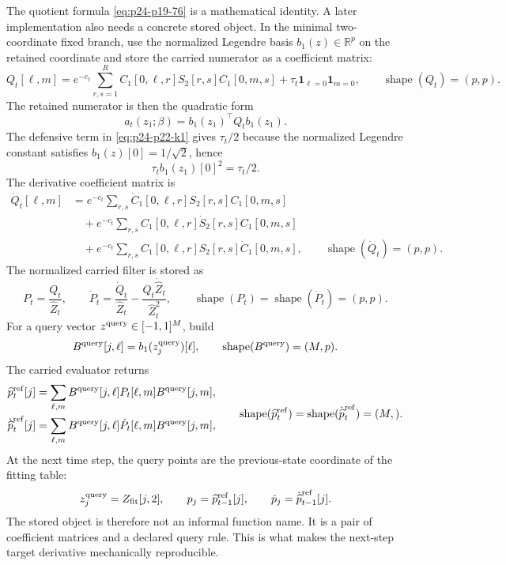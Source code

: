 \documentclass[11pt]{article}
\newcommand{\R}{\mathbb R}
\newcommand{\ind}{\mathbf 1}
\newcommand{\shape}{\operatorname{shape}}
\begin{document}
The quotient formula \eqref{eq:p24-p19-76} is a mathematical identity.  A later implementation
also needs a concrete stored object.  In the minimal two-coordinate fixed
branch, use the normalized Legendre basis \(b_1(z)\in\R^p\) on the retained
coordinate and store the carried numerator as a coefficient matrix:
\[
    Q_t[\ell,m]
    =
    e^{-c_t}\sum_{r,s=1}^{R}
    C_1[0,\ell,r]S_2[r,s]C_1[0,m,s]
    +\tau_t\ind_{\ell=0}\ind_{m=0},
    \qquad
    \shape(Q_t)=(p,p).
    \label{eq:p24-p22-k1}
\]
The retained numerator is then the quadratic form
\[
    a_t(z_1;\beta)=b_1(z_1)^\top Q_t b_1(z_1).
    \label{eq:p24-p22-k2}
\]
The defensive term in \eqref{eq:p24-p22-k1} gives \(\tau_t/2\) because the normalized Legendre
constant satisfies \(b_1(z)[0]=1/\sqrt2\), hence
\[
    \tau_t b_1(z_1)[0]^2=\tau_t/2.
    \label{eq:p24-p22-k3}
\]
The derivative coefficient matrix is
\[
\begin{aligned}
    \dot Q_t[\ell,m]
    &=
    e^{-c_t}\sum_{r,s}
    \dot C_1[0,\ell,r]S_2[r,s]C_1[0,m,s]\\
    &\quad+
    e^{-c_t}\sum_{r,s}
    C_1[0,\ell,r]\dot S_2[r,s]C_1[0,m,s]\\
    &\quad+
    e^{-c_t}\sum_{r,s}
    C_1[0,\ell,r]S_2[r,s]\dot C_1[0,m,s],
    \qquad
    \shape(\dot Q_t)=(p,p).
\end{aligned}
\label{eq:p24-p22-k4}
\]
The normalized carried filter is stored as
\[
    P_t=\frac{Q_t}{\widehat Z_t},
    \qquad
    \dot P_t=
    \frac{\dot Q_t}{\widehat Z_t}
    -
    \frac{Q_t\dot{\widehat Z}_t}{\widehat Z_t^2},
    \qquad
    \shape(P_t)=\shape(\dot P_t)=(p,p).
    \label{eq:p24-p22-k5}
\]
For a query vector \(z^{\rm query}\in[-1,1]^M\), build
\[
    B^{\rm query}[j,\ell]=b_1(z^{\rm query}_j)[\ell],
    \qquad
    \shape(B^{\rm query})=(M,p).
    \label{eq:p24-p22-k6}
\]
The carried evaluator returns
\[
\begin{aligned}
    \widehat p_t^{\rm ref}[j]
    &=
    \sum_{\ell,m}
    B^{\rm query}[j,\ell]P_t[\ell,m]B^{\rm query}[j,m],\\
    \dot{\widehat p}_t^{\rm ref}[j]
    &=
    \sum_{\ell,m}
    B^{\rm query}[j,\ell]\dot P_t[\ell,m]B^{\rm query}[j,m],
\end{aligned}
\qquad
\shape(\widehat p_t^{\rm ref})
=
\shape(\dot{\widehat p}_t^{\rm ref})
=(M,).
\label{eq:p24-p22-k7}
\]
At the next time step, the query points are the previous-state coordinate of
the fitting table:
\[
    z^{\rm query}_j=Z_{\rm fit}[j,2],
    \qquad
    p_j=\widehat p_{t-1}^{\rm ref}[j],
    \qquad
    \dot p_j=\dot{\widehat p}_{t-1}^{\rm ref}[j].
    \label{eq:p24-p22-k8}
\]
The stored object is therefore not an informal function name.  It is a pair of
coefficient matrices and a declared query rule.  This is what makes the
next-step target derivative mechanically reproducible.
\end{document}
